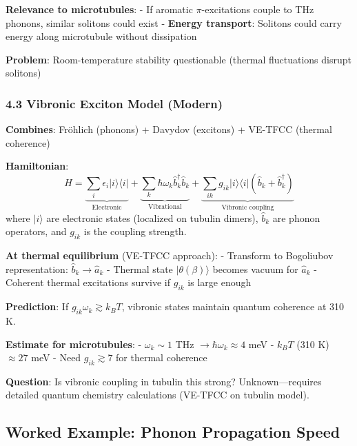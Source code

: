 \textbf{Relevance to microtubules}: - If aromatic \(\pi\)-excitations
couple to THz phonons, similar solitons could exist - \textbf{Energy
transport}: Solitons could carry energy along microtubule without
dissipation

\textbf{Problem}: Room-temperature stability questionable (thermal
fluctuations disrupt solitons)

\subsubsection{4.3 Vibronic Exciton Model
(Modern)}\label{vibronic-exciton-model-modern}

\textbf{Combines}: Fröhlich (phonons) + Davydov (excitons) + VE-TFCC
(thermal coherence)

\textbf{Hamiltonian}:
\[\hat{H} = \underbrace{\sum_i \epsilon_i | i \rangle \langle i |}_{\text{Electronic}} + \underbrace{\sum_k \hbar \omega_k \hat{b}_k^\dagger \hat{b}_k}_{\text{Vibrational}} + \underbrace{\sum_{ik} g_{ik} | i \rangle \langle i | (\hat{b}_k + \hat{b}_k^\dagger)}_{\text{Vibronic coupling}}\]
where \(| i \rangle\) are electronic states (localized on tubulin
dimers), \(\hat{b}_k\) are phonon operators, and \(g_{ik}\) is the
coupling strength.

\textbf{At thermal equilibrium} (VE-TFCC approach): - Transform to
Bogoliubov representation: \(\hat{b}_k \rightarrow \hat{a}_k\) - Thermal
state \(|\theta(\beta)\rangle\) becomes vacuum for \(\hat{a}_k\) -
Coherent thermal excitations survive if \(g_{ik}\) is large enough

\textbf{Prediction}: If \(g_{ik} \omega_k \gtrsim k_B T\), vibronic
states maintain quantum coherence at 310 K.

\textbf{Estimate for microtubules}: - \(\omega_k \sim 1\) THz
\(\rightarrow \hbar \omega_k \approx 4\) meV - \(k_B T\) (310 K)
\(\approx 27\) meV - Need \(g_{ik} \gtrsim 7\) for thermal coherence

\textbf{Question}: Is vibronic coupling in tubulin this strong?
Unknown---requires detailed quantum chemistry calculations (VE-TFCC
on tubulin model).


\subsection{Worked Example: Phonon Propagation Speed}
\label{subsec:worked-example}

